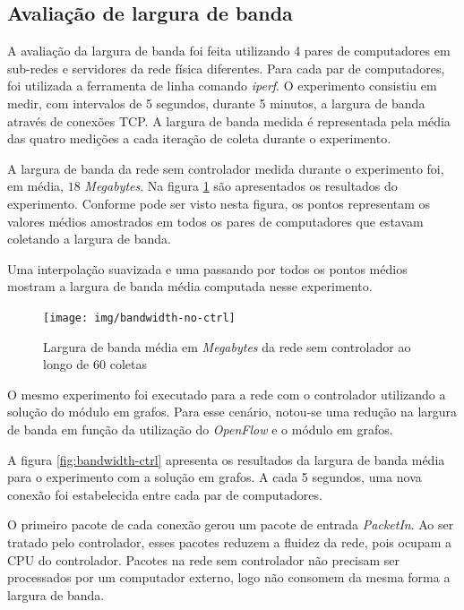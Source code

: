 \subsection{Avaliação de largura de banda}

A avaliação da largura de banda foi feita utilizando 4 pares de computadores
em sub-redes e servidores da rede física diferentes.
Para cada par de computadores, foi utilizada a ferramenta de linha comando
\emph{iperf}.
O experimento consistiu em medir, com intervalos de 5 segundos, durante
5 minutos, a largura de banda através de conexões TCP.
A largura de banda medida é representada pela média das quatro medições a
cada iteração de coleta durante o experimento.

A largura de banda da rede sem controlador medida durante o experimento foi,
em média, $18$ \emph{Megabytes}.
Na figura \ref{fig:bandwidth-no-ctrl} são apresentados os resultados do
experimento.
Conforme pode ser visto nesta figura, os pontos representam os valores
médios amostrados em todos os pares de computadores que estavam coletando
a largura de banda.

\break

Uma interpolação suavizada e uma passando por todos os pontos médios mostram
a largura de banda média computada nesse experimento.

\begin{figure}[!htb]
    \centering
    \label{fig:bandwidth-no-ctrl}
    \texttt{[image: img/bandwidth-no-ctrl]}
    \caption{Largura de banda média em \emph{Megabytes} da rede sem
    controlador ao longo de 60 coletas}
\end{figure}

O mesmo experimento foi executado para a rede com o controlador utilizando
a solução do módulo em grafos.
Para esse cenário, notou-se uma redução na largura de banda em função da
utilização do \emph{OpenFlow} e o módulo em grafos.

A figura \ref{fig:bandwidth-ctrl} apresenta os resultados da largura de banda
média para o experimento com a solução em grafos.
A cada 5 segundos, uma nova conexão foi estabelecida entre cada par de
computadores.

O primeiro pacote de cada conexão gerou um pacote de entrada \emph{PacketIn}.
Ao ser tratado pelo controlador, esses pacotes reduzem a fluidez da rede, pois
ocupam a CPU do controlador.
Pacotes na rede sem controlador não precisam ser processados por um computador
externo, logo não consomem da mesma forma a largura de banda.

